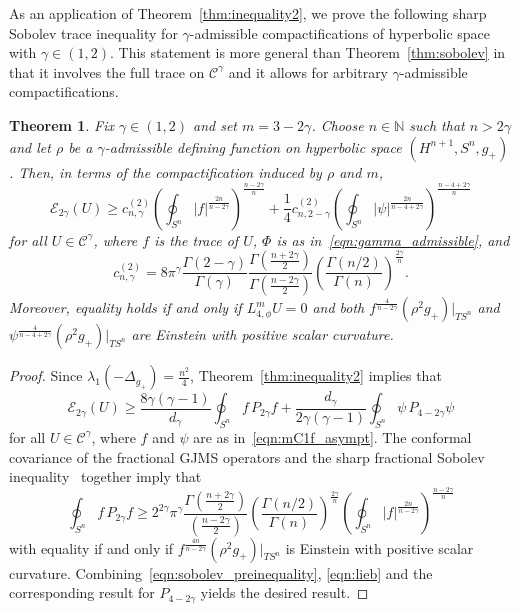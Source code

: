 \documentclass{amsart}
\newtheorem{thm}{Theorem}[section]
\theoremstyle{definition}
\theoremstyle{remark}
\numberwithin{equation}{section}
\begin{document}
As an application of Theorem~\ref{thm:inequality2}, we prove the following sharp Sobolev trace inequality for $\gamma$-admissible compactifications of hyperbolic space with $\gamma\in(1,2)$.  This statement is more general than Theorem~\ref{thm:sobolev} in that it involves the full trace on ${\mathcal{C}}^\gamma$ and it allows for arbitrary $\gamma$-admissible compactifications.

\begin{thm}
 \label{thm:sobolev_genl}
 Fix $\gamma\in(1,2)$ and set $m=3-2\gamma$.  Choose $n\in{\mathbb{N}}$ such that $n>2\gamma$ and let $\rho$ be a $\gamma$-admissible defining function on hyperbolic space $(H^{n+1},S^n,g_+)$.  Then, in terms of the compactification induced by $\rho$ and $m$,
 \[ {\mathcal{E}}_{2\gamma}(U) \geq c_{n,\gamma}^{(2)}\left(\oint_{S^n} {\lvert} f{\rvert}^{\frac{2n}{n-2\gamma}}\right)^{\frac{n-2\gamma}{n}} + \frac{1}{4}c_{n,2-\gamma}^{(2)}\left(\oint_{S^n} {\lvert} \psi{\rvert}^{\frac{2n}{n-4+2\gamma}}\right)^{\frac{n-4+2\gamma}{n}} \]
 for all $U\in{\mathcal{C}}^\gamma$, where $f$ is the trace of $U$, $\Phi$ is as in~\eqref{eqn:gamma_admissible}, and
 \[ c_{n,\gamma}^{(2)} = 8\pi^\gamma\frac{\Gamma(2-\gamma)}{\Gamma(\gamma)}\frac{\Gamma\left(\frac{n+2\gamma}{2}\right)}{\Gamma\left(\frac{n-2\gamma}{2}\right)}\left(\frac{\Gamma(n/2)}{\Gamma(n)}\right)^{\frac{2\gamma}{n}} . \]
 Moreover, equality holds if and only if $L_{4,\phi}^mU=0$ and both $f^{\frac{4}{n-2\gamma}}(\rho^2g_+){\rvert}_{TS^n}$ and $\psi^{\frac{4}{n-4+2\gamma}}(\rho^2g_+){\rvert}_{TS^n}$ are Einstein with positive scalar curvature.
\end{thm}

\begin{proof}
 Since $\lambda_1(-\Delta_{g_+})=\frac{n^2}{4}$, Theorem~\ref{thm:inequality2} implies that
 \begin{equation}
  \label{eqn:sobolev_preinequality}
  {\mathcal{E}}_{2\gamma}(U) \geq \frac{8\gamma(\gamma-1)}{d_\gamma}\oint_{S^n} f\,P_{2\gamma}f + \frac{d_\gamma}{2\gamma(\gamma-1)}\oint_{S^n} \psi\,P_{4-2\gamma}\psi
 \end{equation}
 for all $U\in{\mathcal{C}}^\gamma$, where $f$ and $\psi$ are as in~\eqref{eqn:mC1f_asympt}.  The conformal covariance of the fractional GJMS operators and the sharp fractional Sobolev inequality~\cite{CotsiolisTavoularis2004,FrankLieb2012b,Lieb1983} together imply that
 \begin{equation}
  \label{eqn:lieb}
  \oint_{S^n}f\,P_{2\gamma}f \geq 2^{2\gamma}\pi^\gamma\frac{\Gamma\left(\frac{n+2\gamma}{2}\right)}{\left(\frac{n-2\gamma}{2}\right)}\left(\frac{\Gamma(n/2)}{\Gamma(n)}\right)^{\frac{2\gamma}{n}}\left(\oint_{S^n} {\lvert} f{\rvert}^{\frac{2n}{n-2\gamma}}\right)^{\frac{n-2\gamma}{n}}
 \end{equation}
 with equality if and only if $f^{\frac{4n}{n-2\gamma}}(\rho^2g_+){\rvert}_{TS^n}$ is Einstein with positive scalar curvature.  Combining~\eqref{eqn:sobolev_preinequality}, \eqref{eqn:lieb} and the corresponding result for $P_{4-2\gamma}$ yields the desired result.
\end{proof}
\end{document}
